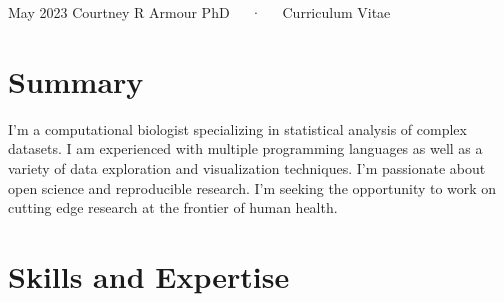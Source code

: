 \documentclass[11pt,a4paper,]{awesome-cv}
\begin{document}
\makecvheader

\makecvfooter
  {May 2023}
    { Courtney R Armour PhD~~~·~~~Curriculum Vitae}
  {\thepage}






\hypertarget{summary}{%
\section{Summary}\label{summary}}

I'm a computational biologist specializing in statistical analysis of
complex datasets. I am experienced with multiple programming languages
as well as a variety of data exploration and visualization techniques.
I'm passionate about open science and reproducible research. I'm seeking
the opportunity to work on cutting edge research at the frontier of
human health.

\hypertarget{skills-and-expertise}{%
\section{\texorpdfstring{\faCogs Skills and
Expertise}{Skills and Expertise}}\label{skills-and-expertise}}
\end{document}
